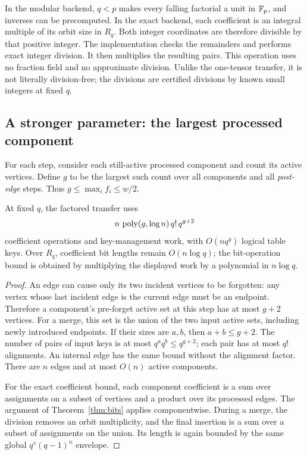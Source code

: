 In the modular backend, $q<p$ makes every falling factorial a unit in
$\mathbb F_p$, and inverses can be precomputed. In the exact backend, each
coefficient is an integral multiple of its orbit size in $R_q$.
Both integer coordinates are therefore divisible by that positive integer.
The implementation checks the remainders and performs exact integer
division. It then multiplies the resulting pairs.
This operation uses no fraction field and no approximate division.
Unlike the one-tensor transfer, it is not literally division-free; the
divisions are certified divisions by known small integers at fixed $q$.

\subsection{A stronger parameter: the largest processed component}

For each step, consider each still-active processed component and count its
active vertices. Define $g$ to be the largest such count over all components
and all \emph{post-edge} steps. Thus $g\le\max_i f_i\le w/2$.

\begin{theorem}\label{thm:componentwidth}
At fixed $q$, the factored transfer uses
\[
 n\,\operatorname{poly}(g,\log n)\,q!\,q^{g+2}
\]
coefficient operations and key-management work, with
$O(nq^g)$ logical table keys. Over $R_q$, coefficient bit lengths remain
$O(n\log q)$; the bit-operation bound is obtained by multiplying the
displayed work by a polynomial in $n\log q$.
\end{theorem}
\begin{proof}
An edge can cause only its two incident vertices to be forgotten: any
vertex whose last incident edge is the current edge must be an endpoint.
Therefore a component's pre-forget active set at this step has at most
$g+2$ vertices. For a merge, this set is the union of the two input active
sets, including newly introduced endpoints. If their sizes are $a,b$, then
$a+b\le g+2$. The number of pairs of input keys is at most
$q^a q^b\le q^{g+2}$; each pair has at most $q!$ alignments.
An internal edge has the same bound without the alignment factor.
There are $n$ edges and at most $O(n)$ active components.

For the exact coefficient bound, each component coefficient is a sum over
assignments on a subset of vertices and a product over its processed edges.
The argument of Theorem~\ref{thm:bits} applies componentwise. During a merge,
the division removes an orbit multiplicity, and the final insertion is a
sum over a subset of assignments on the union. Its length is again bounded
by the same global $q^v(q-1)^n$ envelope.
\end{proof}

